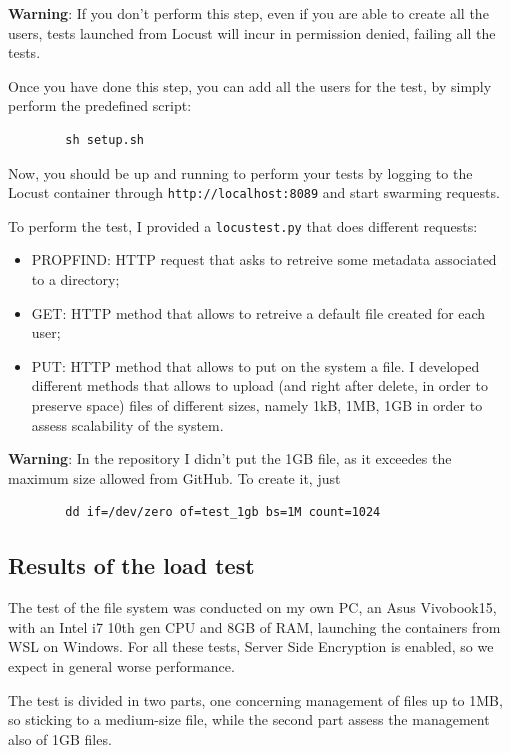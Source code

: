 \documentclass{article}
\begin{document}
	\textbf{Warning}: If you don't perform this step, even if you are able to create all the users, tests launched from Locust will incur in permission denied, failing all the tests.
	
	Once you have done this step, you can add all the users for the test, by simply perform the predefined script:
	\begin{verbatim}
		sh setup.sh
	\end{verbatim}
		
	Now, you should be up and running to perform your tests by logging to the Locust container through \verb|http://localhost:8089| and start swarming requests.
	
	To perform the test, I provided a \verb|locustest.py| that does different requests:
	\begin{itemize}
		\item PROPFIND: HTTP request that asks to retreive some metadata associated to a directory;
		\item GET: HTTP method that allows to retreive a default file created for each user;
		\item PUT: HTTP method that allows to put on the system a file. I developed 
		different methods that allows to upload (and right after delete, in order to preserve space) files of different sizes, namely 1kB, 1MB, 1GB in order to assess scalability of the system.
	\end{itemize}

	\textbf{Warning}: In the repository I didn't put the 1GB file, as it exceedes the maximum size allowed from GitHub. To create it, just
	\begin{verbatim}
		dd if=/dev/zero of=test_1gb bs=1M count=1024
	\end{verbatim}
	
	\subsection{Results of the load test}
	The test of the file system was conducted on my own PC, an Asus Vivobook15, with an Intel i7 10th gen CPU and 8GB of RAM, launching the containers from WSL on Windows. For all these tests, Server Side Encryption is enabled, so we expect in general worse performance.
	
	The test is divided in two parts, one concerning management of files up to 1MB, so sticking to a medium-size file, while the second part assess the management also of 1GB files.
	
\end{document}
